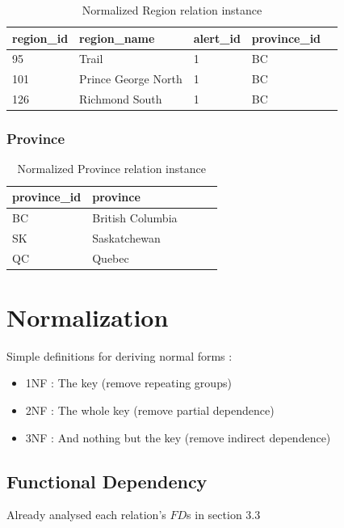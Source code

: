 \documentclass{article}
\begin{document}
\begin{table}[H]
\centering
\begin{adjustbox}{width=0.45\textwidth,center=\textwidth}
\begin{tabular}{|l|l|l|l|l|} 
        \hline
        region\_id & region\_name & alert\_id & province\_id \\ 
        \hline
        95 & Trail & 1 & BC \\
        101 & Prince George North & 1 & BC\\
        126 & Richmond South  & 1 & BC\\
        \hline
\end{tabular}
\end{adjustbox}
\caption{Normalized Region relation instance}
\end{table}


\subsubsection{Province}
\begin{table}[H]
\centering
\begin{adjustbox}{width=0.35\textwidth,center=\textwidth}
\begin{tabular}{|l|l|l|l|l|} 
        \hline
        province\_id & province \\ 
        \hline
        BC & British Columbia\\
        SK & Saskatchewan\\
        QC & Quebec\\
        \hline
\end{tabular}
\end{adjustbox}
\caption{Normalized Province relation instance}
\end{table}

\newpage
\section{Normalization}
Simple definitions for deriving normal forms :
\begin{itemize}
    \item 1NF : The key (remove repeating groups)
    \item 2NF : The whole key (remove partial dependence)
    \item 3NF : And nothing but the key (remove indirect dependence)
\end{itemize}

\subsection{Functional Dependency}
Already analysed each relation's $FD$s in section 3.3
\end{document}
